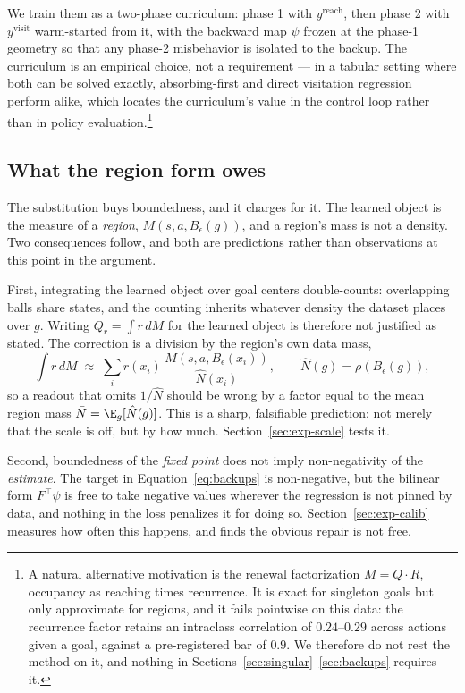We train them as a two-phase curriculum: phase 1 with $y^{\mathrm{reach}}$, then
phase 2 with $y^{\mathrm{visit}}$ warm-started from it, with the backward map
$\psi$ frozen at the phase-1 geometry so that any phase-2 misbehavior is isolated
to the backup. The curriculum is an empirical choice, not a requirement --- in a
tabular setting where both can be solved exactly, absorbing-first and direct
visitation regression perform alike, which locates the curriculum's value in the
control loop rather than in policy evaluation.\footnote{A natural alternative motivation is the renewal factorization
$M = Q\cdot R$, occupancy as reaching times recurrence. It is exact for singleton
goals but only approximate for regions, and it fails pointwise on this data: the
recurrence factor retains an intraclass correlation of $0.24$--$0.29$ across
actions given a goal, against a pre-registered bar of $0.9$. We therefore do not
rest the method on it, and nothing in
Sections~\ref{sec:singular}--\ref{sec:backups} requires it.}

\subsection{What the region form owes}
\label{sec:owed}

The substitution buys boundedness, and it charges for it. The learned object is
the measure of a \emph{region}, $M(s,a,B_\epsilon(g))$, and a region's mass is not
a density. Two consequences follow, and both are predictions rather than
observations at this point in the argument.

First, integrating the learned object over goal centers double-counts: overlapping
balls share states, and the counting inherits whatever density the dataset places
over $g$. Writing $Q_r=\int r\,dM$ for the learned object is therefore not
justified as stated. The correction is a division by the region's own data mass,
\begin{equation}
\label{eq:nhat}
\int r\,dM \;\approx\; \sum_i r(x_i)\,\frac{M(s,a,B_\epsilon(x_i))}{\hat N(x_i)},
\qquad \hat N(g)=\rho(B_\epsilon(g)),
\end{equation}
so a readout that omits $1/\hat N$ should be wrong by a factor equal to the mean
region mass $\bar N = \E_g[\hat N(g)]$. This is a sharp, falsifiable prediction:
not merely that the scale is off, but by how much. Section~\ref{sec:exp-scale}
tests it.

Second, boundedness of the \emph{fixed point} does not imply non-negativity of the
\emph{estimate}. The target in Equation~\ref{eq:backups} is non-negative, but the
bilinear form $F^{\top}\psi$ is free to take negative values wherever the
regression is not pinned by data, and nothing in the loss penalizes it for doing
so. Section~\ref{sec:exp-calib} measures how often this happens, and finds the
obvious repair is not free.
